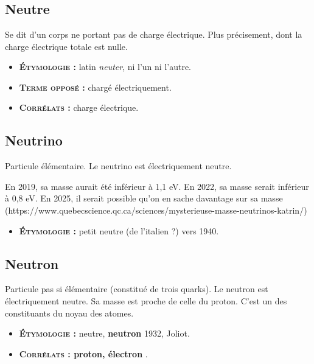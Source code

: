 \chapter{}
\section{Neutre}
Se dit d'un corps ne portant pas de charge électrique. Plus précisement, dont la charge électrique totale est nulle.
{\footnotesize
\begin{itemize}[leftmargin=1cm, label=, itemsep=1pt]
\item {\bf \textsc{Étymologie} :} latin {\it neuter}, ni l'un ni l'autre.
\item {\bf \textsc{Terme opposé} :} chargé électriquement.
\item {\bf \textsc{Corrélats} :} charge électrique.
\end{itemize}
}
\section{Neutrino}
Particule élémentaire.
Le neutrino est électriquement neutre.

En 2019, sa masse aurait été inférieur à 1,1 eV.
En 2022, sa masse serait inférieur à 0,8 eV.
En 2025, il serait possible qu'on en sache davantage sur sa masse
{\footnotesize
(https://www.quebecscience.qc.ca/sciences/mysterieuse-masse-neutrinos-katrin/)
}

{\footnotesize
\begin{itemize}[leftmargin=1cm, label=, itemsep=1pt]
\item {\bf \textsc{Étymologie} :} petit neutre (de l'italien ?) vers 1940.
\end{itemize}
}
\section{Neutron}
Particule pas si élémentaire (constitué de trois quarks).
Le neutron est électriquement neutre.
Sa masse est proche de celle du proton.
C'est un des constituants du noyau des atomes.
{\footnotesize
\begin{itemize}[leftmargin=1cm, label=, itemsep=1pt]
\item {\bf \textsc{Étymologie} :} neutre, {\bf neutron} 1932, Joliot.
\item {\bf \textsc{Corrélats} : proton, électron} .
\end{itemize}
}
